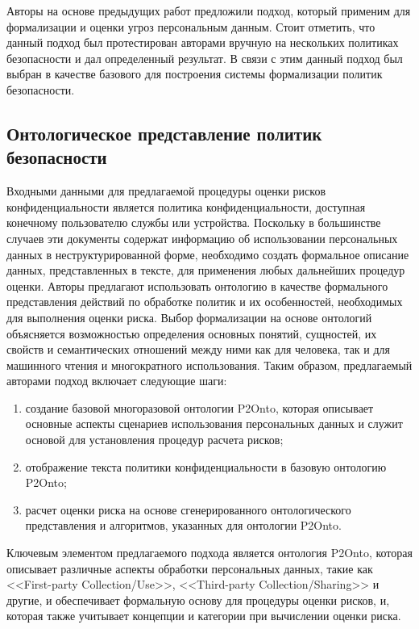 \documentclass[../main]{subfiles}
\begin{document}
Авторы \cite{P2Onto} на основе предыдущих работ предложили подход, который применим для формализации и оценки угроз персональным данным. Стоит отметить, что данный подход был протестирован авторами вручную на нескольких политиках безопасности и дал определенный результат. В связи с этим данный подход был выбран в качестве базового для построения системы формализации политик безопасности.

\subsection{Онтологическое представление политик безопасности}

Входными данными для предлагаемой процедуры оценки рисков конфиденциальности является политика конфиденциальности, доступная конечному пользователю службы или устройства. Поскольку в большинстве случаев эти документы содержат информацию об использовании персональных данных в неструктурированной форме, необходимо создать формальное описание данных, представленных в тексте, для применения любых дальнейших процедур оценки. Авторы \cite{P2Onto} предлагают использовать онтологию в качестве формального представления действий по обработке политик и их особенностей, необходимых для выполнения оценки риска. Выбор формализации на основе онтологий объясняется возможностью определения основных понятий, сущностей, их свойств и семантических отношений между ними как для человека, так и для машинного чтения и многократного использования. Таким образом, предлагаемый авторами подход включает следующие шаги: 
\begin{enumerate}
    \item создание базовой многоразовой онтологии P2Onto, которая описывает основные аспекты сценариев использования персональных данных и служит основой для установления процедур расчета рисков;
    \item отображение текста политики конфиденциальности в базовую онтологию P2Onto;
    \item расчет оценки риска на основе сгенерированного онтологического представления и алгоритмов, указанных для онтологии P2Onto.
\end{enumerate}

Ключевым элементом предлагаемого подхода является онтология P2Onto, которая описывает различные аспекты обработки персональных данных, такие как <<First-party Collection/Use>>, <<Third-party Collection/Sharing>> и другие, и обеспечивает формальную основу для процедуры оценки рисков, и, которая также учитывает концепции и категории при вычислении оценки риска.
\end{document}
